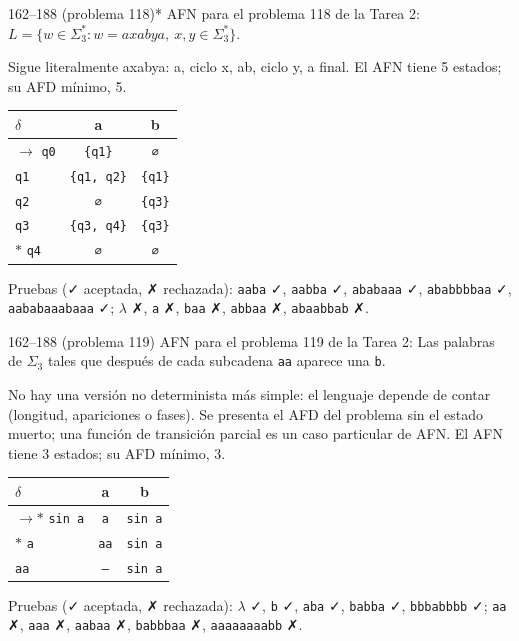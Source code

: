 \documentclass[11pt]{article}
\begin{document}
\begin{ejercicio}{162--188 (problema 118)}{*}
AFN para el problema 118 de la Tarea 2: $L = \{w \in \Sigma_3^* : w = axabya,\ x, y \in \Sigma_3^*\}$.
\end{ejercicio}
\proc Sigue literalmente axabya: a, ciclo x, ab, ciclo y, a final. El AFN tiene 5 estados; su AFD mínimo, 5.
\begin{center}\small\begin{tabular}{lcc}\toprule
$\delta$ & a & b \\\midrule
$\to$ \texttt{q0} & \texttt{\{q1\}} & \texttt{∅} \\
 \texttt{q1} & \texttt{\{q1, q2\}} & \texttt{\{q1\}} \\
 \texttt{q2} & \texttt{∅} & \texttt{\{q3\}} \\
 \texttt{q3} & \texttt{\{q3, q4\}} & \texttt{\{q3\}} \\
$*$ \texttt{q4} & \texttt{∅} & \texttt{∅} \\
\bottomrule\end{tabular}\end{center}
Pruebas (✓ aceptada, ✗ rechazada): \texttt{aaba} ✓, \texttt{aabba} ✓, \texttt{ababaaa} ✓, \texttt{ababbbbaa} ✓, \texttt{aababaaabaaa} ✓; $\lambda$ ✗, \texttt{a} ✗, \texttt{baa} ✗, \texttt{abbaa} ✗, \texttt{abaabbab} ✗.



\begin{ejercicio}{162--188 (problema 119)}{}
AFN para el problema 119 de la Tarea 2: Las palabras de $\Sigma_3$ tales que después de cada subcadena \texttt{aa} aparece una \texttt{b}.
\end{ejercicio}
\proc No hay una versión no determinista más simple: el lenguaje depende de contar (longitud, apariciones o fases). Se presenta el AFD del problema sin el estado muerto; una función de transición parcial es un caso particular de AFN. El AFN tiene 3 estados; su AFD mínimo, 3.
\begin{center}\small\begin{tabular}{lcc}\toprule
$\delta$ & a & b \\\midrule
$\to$$*$ \texttt{sin a} & \texttt{a} & \texttt{sin a} \\
$*$ \texttt{a} & \texttt{aa} & \texttt{sin a} \\
 \texttt{aa} & \texttt{--} & \texttt{sin a} \\
\bottomrule\end{tabular}\end{center}
Pruebas (✓ aceptada, ✗ rechazada): $\lambda$ ✓, \texttt{b} ✓, \texttt{aba} ✓, \texttt{babba} ✓, \texttt{bbbabbbb} ✓; \texttt{aa} ✗, \texttt{aaa} ✗, \texttt{aabaa} ✗, \texttt{babbbaa} ✗, \texttt{aaaaaaaabb} ✗.
\end{document}
